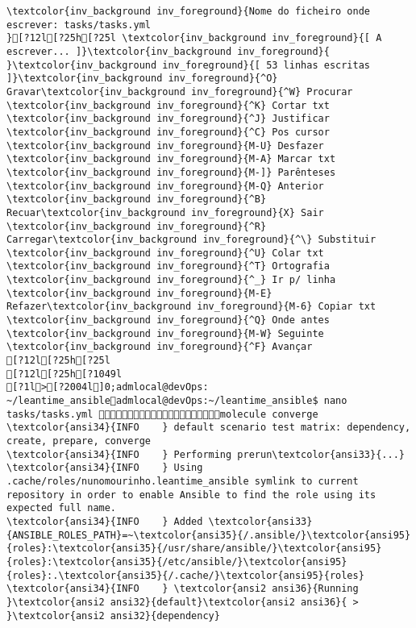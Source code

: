 \documentclass{scrartcl}
\begin{document}
\begin{Verbatim}
\textcolor{inv_background inv_foreground}{Nome do ficheiro onde escrever: tasks/tasks.yml                                                                                                                                              }[?12l[?25h[?25l \textcolor{inv_background inv_foreground}{[ A escrever... ]}\textcolor{inv_background inv_foreground}{          }\textcolor{inv_background inv_foreground}{[ 53 linhas escritas ]}\textcolor{inv_background inv_foreground}{^O} Gravar\textcolor{inv_background inv_foreground}{^W} Procurar      \textcolor{inv_background inv_foreground}{^K} Cortar txt    \textcolor{inv_background inv_foreground}{^J} Justificar    \textcolor{inv_background inv_foreground}{^C} Pos cursor    \textcolor{inv_background inv_foreground}{M-U} Desfazer     \textcolor{inv_background inv_foreground}{M-A} Marcar txt   \textcolor{inv_background inv_foreground}{M-]} Parênteses   \textcolor{inv_background inv_foreground}{M-Q} Anterior     \textcolor{inv_background inv_foreground}{^B} Recuar\textcolor{inv_background inv_foreground}{X} Sair    \textcolor{inv_background inv_foreground}{^R} Carregar\textcolor{inv_background inv_foreground}{^\} Substituir    \textcolor{inv_background inv_foreground}{^U} Colar txt     \textcolor{inv_background inv_foreground}{^T} Ortografia    \textcolor{inv_background inv_foreground}{^_} Ir p/ linha   \textcolor{inv_background inv_foreground}{M-E} Refazer\textcolor{inv_background inv_foreground}{M-6} Copiar txt   \textcolor{inv_background inv_foreground}{^Q} Onde antes    \textcolor{inv_background inv_foreground}{M-W} Seguinte     \textcolor{inv_background inv_foreground}{^F} Avançar
[?12l[?25h[?25l
[?12l[?25h[?1049l
[?1l>[?2004l]0;admlocal@devOps: ~/leantime_ansibleadmlocal@devOps:~/leantime_ansible$ nano tasks/tasks.yml molecule converge
\textcolor{ansi34}{INFO    } default scenario test matrix: dependency, create, prepare, converge
\textcolor{ansi34}{INFO    } Performing prerun\textcolor{ansi33}{...}
\textcolor{ansi34}{INFO    } Using .cache/roles/nunomourinho.leantime_ansible symlink to current repository in order to enable Ansible to find the role using its expected full name.
\textcolor{ansi34}{INFO    } Added \textcolor{ansi33}{ANSIBLE_ROLES_PATH}=~\textcolor{ansi35}{/.ansible/}\textcolor{ansi95}{roles}:\textcolor{ansi35}{/usr/share/ansible/}\textcolor{ansi95}{roles}:\textcolor{ansi35}{/etc/ansible/}\textcolor{ansi95}{roles}:.\textcolor{ansi35}{/.cache/}\textcolor{ansi95}{roles}
\textcolor{ansi34}{INFO    } \textcolor{ansi2 ansi36}{Running }\textcolor{ansi2 ansi32}{default}\textcolor{ansi2 ansi36}{ > }\textcolor{ansi2 ansi32}{dependency}

\end{Verbatim}
\end{document}
